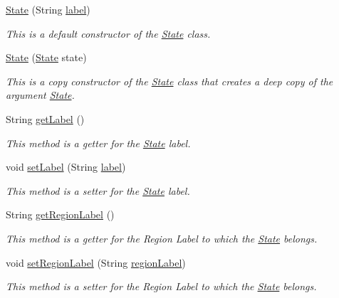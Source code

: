 \begin{DoxyCompactItemize}
\hyperlink{classmdp_1_1core_1_1_state_a145a71cda6b5e67d05745c17dd7fc995}{State} (String \hyperlink{classmdp_1_1core_1_1_state_a40b54cc46e175c748d5ce129aba70633}{label})
\begin{DoxyCompactList}\small\item\em This is a default constructor of the \hyperlink{classmdp_1_1core_1_1_state}{State} class. \end{DoxyCompactList}\item 
\hyperlink{classmdp_1_1core_1_1_state_aeea557e31f354038b7aa0633c5236738}{State} (\hyperlink{classmdp_1_1core_1_1_state}{State} state)
\begin{DoxyCompactList}\small\item\em This is a copy constructor of the \hyperlink{classmdp_1_1core_1_1_state}{State} class that creates a deep copy of the argument \hyperlink{classmdp_1_1core_1_1_state}{State}. \end{DoxyCompactList}\item 
String \hyperlink{classmdp_1_1core_1_1_state_af3bb33b1a7d6de482338e2b584a72c61}{get\+Label} ()
\begin{DoxyCompactList}\small\item\em This method is a getter for the \hyperlink{classmdp_1_1core_1_1_state}{State} label. \end{DoxyCompactList}\item 
void \hyperlink{classmdp_1_1core_1_1_state_a0757d224557cb46cd981fd527545b2a9}{set\+Label} (String \hyperlink{classmdp_1_1core_1_1_state_a40b54cc46e175c748d5ce129aba70633}{label})
\begin{DoxyCompactList}\small\item\em This method is a setter for the \hyperlink{classmdp_1_1core_1_1_state}{State} label. \end{DoxyCompactList}\item 
String \hyperlink{classmdp_1_1core_1_1_state_a36812356307dc97bf793b2974a650583}{get\+Region\+Label} ()
\begin{DoxyCompactList}\small\item\em This method is a getter for the Region Label to which the \hyperlink{classmdp_1_1core_1_1_state}{State} belongs. \end{DoxyCompactList}\item 
void \hyperlink{classmdp_1_1core_1_1_state_ad74414cd3ad16e4d10638d57856253a5}{set\+Region\+Label} (String \hyperlink{classmdp_1_1core_1_1_state_aa6f24dca5cb78d028e99f69b9e6ccb2c}{region\+Label})
\begin{DoxyCompactList}\small\item\em This method is a setter for the Region Label to which the \hyperlink{classmdp_1_1core_1_1_state}{State} belongs. \end{DoxyCompactList}\item 

\end{DoxyCompactItemize}
